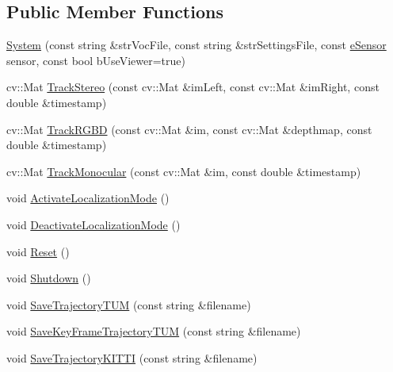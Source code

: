\subsection*{Public Member Functions}
\begin{DoxyCompactItemize}
\item 
\mbox{\hyperlink{class_o_r_b___s_l_a_m2_1_1_system_a687bbabebe054f6d40b44b1ba64bc57a}{System}} (const string \&str\+Voc\+File, const string \&str\+Settings\+File, const \mbox{\hyperlink{class_o_r_b___s_l_a_m2_1_1_system_a3f14b84bb9663e1129e649e592bd14cf}{e\+Sensor}} sensor, const bool b\+Use\+Viewer=true)
\item 
cv\+::\+Mat \mbox{\hyperlink{class_o_r_b___s_l_a_m2_1_1_system_a61226615f8d33afee19bb4ca188cc021}{Track\+Stereo}} (const cv\+::\+Mat \&im\+Left, const cv\+::\+Mat \&im\+Right, const double \&timestamp)
\item 
cv\+::\+Mat \mbox{\hyperlink{class_o_r_b___s_l_a_m2_1_1_system_a3b5be10e71c3484c11171bca16cdcd8e}{Track\+R\+G\+BD}} (const cv\+::\+Mat \&im, const cv\+::\+Mat \&depthmap, const double \&timestamp)
\item 
cv\+::\+Mat \mbox{\hyperlink{class_o_r_b___s_l_a_m2_1_1_system_a0408659bafa31c4d0722ccd032fb9430}{Track\+Monocular}} (const cv\+::\+Mat \&im, const double \&timestamp)
\item 
void \mbox{\hyperlink{class_o_r_b___s_l_a_m2_1_1_system_a6cd39ec31a23d7ba5ebe1a6e4f4a0f89}{Activate\+Localization\+Mode}} ()
\item 
void \mbox{\hyperlink{class_o_r_b___s_l_a_m2_1_1_system_a3bb91bfb9547b01596dac3e9fdd4adfd}{Deactivate\+Localization\+Mode}} ()
\item 
void \mbox{\hyperlink{class_o_r_b___s_l_a_m2_1_1_system_a33f5eb6f33d14cdda2a889fe06d6619e}{Reset}} ()
\item 
void \mbox{\hyperlink{class_o_r_b___s_l_a_m2_1_1_system_aa934876a230dfa99e123f62b4b54d0cb}{Shutdown}} ()
\item 
void \mbox{\hyperlink{class_o_r_b___s_l_a_m2_1_1_system_a118df14a34bac039f9880c886ee3678f}{Save\+Trajectory\+T\+UM}} (const string \&filename)
\item 
void \mbox{\hyperlink{class_o_r_b___s_l_a_m2_1_1_system_a6435a029f66a34103c434aa16e80eae3}{Save\+Key\+Frame\+Trajectory\+T\+UM}} (const string \&filename)
\item 
void \mbox{\hyperlink{class_o_r_b___s_l_a_m2_1_1_system_a3a28b57ac7267d5c51d3b8492d2f5d5c}{Save\+Trajectory\+K\+I\+T\+TI}} (const string \&filename)
\end{DoxyCompactItemize}


